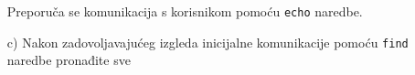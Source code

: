 \documentclass{exam}
\newcommand{\shell}[1]{\texttt{#1}}
\begin{document}
\begin{itemize}
                                                                                                                                Preporuča
                                                                                                                                se
                                                                                                                                komunikacija
                                                                                                                                s
                                                                                                                                korisnikom
                                                                                                                                pomoću
                                                                                                                                \shell{echo}
                                                                                                                                naredbe.
                                                                                                                                    \item[c)]
                                                                                                                                        Nakon
                                                                                                                                        zadovoljavajućeg
                                                                                                                                        izgleda
                                                                                                                                        inicijalne
                                                                                                                                        komunikacije
                                                                                                                                        pomoću
                                                                                                                                        \shell{find}
                                                                                                                                        naredbe
                                                                                                                                        pronađite
                                                                                                                                        sve

\end{itemize}
\end{document}
